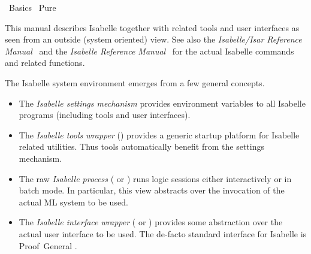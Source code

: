 %
\begin{isabellebody}%
\def\isabellecontext{Basics}%
%
\isadelimtheory
\isanewline
\isanewline
%
\endisadelimtheory
%
\isatagtheory
{}\isamarkupfalse%
\ Basics\isanewline
{}\ Pure\isanewline
{}%
\endisatagtheory
{\isafoldtheory}%
%
\isadelimtheory
%
\endisadelimtheory
%
\isamarkuptrue%
%
\begin{isamarkuptext}%
This manual describes Isabelle together with related tools and user
  interfaces as seen from an outside (system oriented) view.  See also
  the \emph{Isabelle/Isar Reference Manual}~\cite{isabelle-isar-ref}
  and the \emph{Isabelle Reference Manual}~\cite{isabelle-ref} for the
  actual Isabelle commands and related functions.

  \medskip The Isabelle system environment emerges from a few general
  concepts.

  \begin{itemize}

  \item The \emph{Isabelle settings mechanism} provides environment
  variables to all Isabelle programs (including tools and user
  interfaces).

  \item The \emph{Isabelle tools wrapper} (\hypertarget{executable.isatool}{\hyperlink{executable.isatool}{\mbox{}}})
  provides a generic startup platform for Isabelle related utilities.
  Thus tools automatically benefit from the settings mechanism.

  \item The raw \emph{Isabelle process} (\hypertarget{executable.isabelle}{\hyperlink{executable.isabelle}{\mbox{}}} or
  \hypertarget{executable.isabelle-process}{\hyperlink{executable.isabelle-process}{\mbox{}}}) runs logic sessions either
  interactively or in batch mode.  In particular, this view abstracts
  over the invocation of the actual ML system to be used.

  \item The \emph{Isabelle interface wrapper} (\hypertarget{executable.Isabelle}{\hyperlink{executable.Isabelle}{\mbox{}}} or \hypertarget{executable.isabelle-interface}{\hyperlink{executable.isabelle-interface}{\mbox{}}}) provides some
  abstraction over the actual user interface to be used.  The de-facto
  standard interface for Isabelle is Proof~General
  \cite{proofgeneral}.


\end{itemize}
\end{isamarkuptext}
\end{isabellebody}
